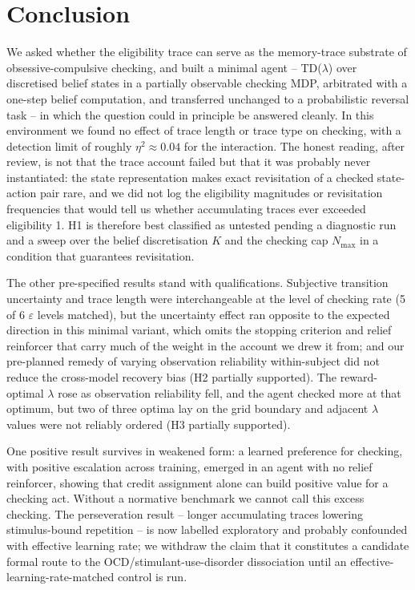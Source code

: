 \documentclass[11pt,a4paper]{article}
\begin{document}
\section{Conclusion}
We asked whether the eligibility trace can serve as the memory-trace substrate of obsessive-compulsive checking, and built a minimal agent -- TD($\lambda$) over discretised belief states in a partially observable checking MDP, arbitrated with a one-step belief computation, and transferred unchanged to a probabilistic reversal task -- in which the question could in principle be answered cleanly. In this environment we found no effect of trace length or trace type on checking, with a detection limit of roughly $\eta^2 \approx 0.04$ for the interaction. The honest reading, after review, is not that the trace account failed but that it was probably never instantiated: the state representation makes exact revisitation of a checked state-action pair rare, and we did not log the eligibility magnitudes or revisitation frequencies that would tell us whether accumulating traces ever exceeded eligibility 1. H1 is therefore best classified as untested pending a diagnostic run and a sweep over the belief discretisation $K$ and the checking cap $N_{\max}$ in a condition that guarantees revisitation.

The other pre-specified results stand with qualifications. Subjective transition uncertainty and trace length were interchangeable at the level of checking rate (5 of 6 $\varepsilon$ levels matched), but the uncertainty effect ran opposite to the expected direction in this minimal variant, which omits the stopping criterion and relief reinforcer that carry much of the weight in the account we drew it from; and our pre-planned remedy of varying observation reliability within-subject did not reduce the cross-model recovery bias (H2 partially supported). The reward-optimal $\lambda$ rose as observation reliability fell, and the agent checked more at that optimum, but two of three optima lay on the grid boundary and adjacent $\lambda$ values were not reliably ordered (H3 partially supported).

One positive result survives in weakened form: a learned preference for checking, with positive escalation across training, emerged in an agent with no relief reinforcer, showing that credit assignment alone can build positive value for a checking act. Without a normative benchmark we cannot call this excess checking. The perseveration result -- longer accumulating traces lowering stimulus-bound repetition -- is now labelled exploratory and probably confounded with effective learning rate; we withdraw the claim that it constitutes a candidate formal route to the OCD/stimulant-use-disorder dissociation until an effective-learning-rate-matched control is run.
\end{document}
